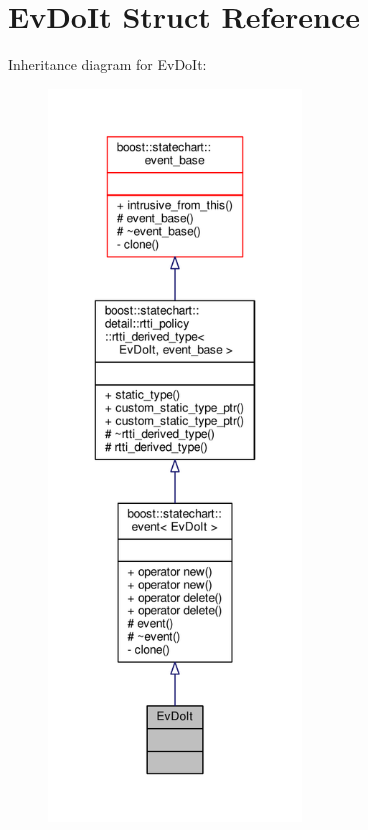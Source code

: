 \hypertarget{struct_ev_do_it}{}\section{Ev\+Do\+It Struct Reference}
\label{struct_ev_do_it}


Inheritance diagram for Ev\+Do\+It\+:
\nopagebreak
\begin{figure}[H]
\begin{center}
\leavevmode
\includegraphics[height=550pt]{struct_ev_do_it__inherit__graph}
\end{center}
\end{figure}


